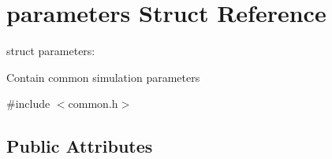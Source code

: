 \hypertarget{structparameters}{\section{parameters Struct Reference}
\label{structparameters}
}


struct parameters\-: \par
Contain common simulation parameters \par
 




{\ttfamily \#include $<$common.\-h$>$}

\subsection*{Public Attributes}
